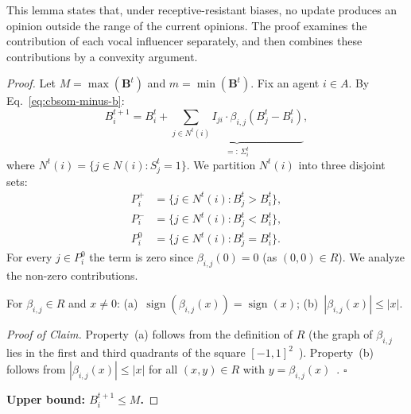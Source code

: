 

\cbsomBounds*

This lemma states that, under receptive-resistant biases, no update
produces an opinion outside the range of the current opinions. The proof
examines the contribution of each vocal influencer separately, and then
combines these contributions by a convexity argument.

\begin{proof}\label{proof:cbsom-bounds}
  Let $M=\max(\mathbf{B}^t)$ and $m=\min(\mathbf{B}^t)$.
  Fix an agent $i\in A$.
  By Eq.~\eqref{eq:cbsom-minus-b}:
  \begin{equation}\label{eq:app-bounds-expand}
    B_i^{t+1}
    = B_i^t
      + \underbrace{\sum_{j\in N^t(i)}
          I_{ji}\cdot\beta_{i,j}(B_j^t - B_i^t)}_{=:\,\Sigma_i^t},
  \end{equation}
  where $N^t(i)=\{j\in N(i):S_j^t=1\}$.
  We partition $N^t(i)$ into three disjoint sets:
  \begin{align*}
    P^+_i &= \{j\in N^t(i): B_j^t > B_i^t\},\\
    P^-_i &= \{j\in N^t(i): B_j^t < B_i^t\},\\
    P^0_i &= \{j\in N^t(i): B_j^t = B_i^t\}.
  \end{align*}
  For every $j\in P^0_i$ the term is zero since $\beta_{i,j}(0)=0$
  (as $(0,0)\in R$).
  We analyze the non-zero contributions.

  \begin{pclaim}
    \label{claim:R-properties}
    For $\beta_{i,j}\in R$ and $x\ne 0$:
    (a)~$\operatorname{sign}(\beta_{i,j}(x))=\operatorname{sign}(x)$;
    (b)~$|\beta_{i,j}(x)|\le|x|$.
  \end{pclaim}

  \noindent\emph{Proof of Claim.}
  Property~(a) follows from the definition of $R$
  (the graph of $\beta_{i,j}$ lies in the first and third quadrants
  of the square $[-1,1]^2$~\cite{Alvim2024}).
  Property~(b) follows from $|\beta_{i,j}(x)|\le|x|$ for all $(x,y)\in R$
  with $y=\beta_{i,j}(x)$~\cite{Alvim2024}. \hfill$\square$

  \medskip\noindent\textbf{Upper bound: $B_i^{t+1}\le M$.}


\end{proof}
